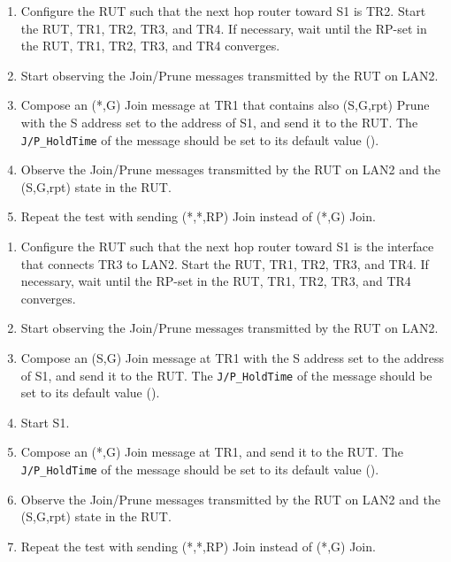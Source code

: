 \documentclass[11pt]{report}
\begin{document}
\begin{enumerate}

  \item Configure the RUT such that the next hop router toward S1 is
  TR2. Start the RUT, TR1, TR2, TR3, and TR4. If necessary, wait until the
  RP-set in the RUT, TR1, TR2, TR3, and TR4 converges.

  \item Start observing the Join/Prune messages transmitted by the RUT on
  LAN2.

  \item Compose an (*,G) Join message at TR1 that contains also (S,G,rpt)
  Prune with the S address set to the address of S1, and send it to the RUT.
  The \verb=J/P_HoldTime= of the message should be set to its default
  value ({\PimsmJPHoldTime}).

  \item Observe the Join/Prune messages transmitted by the RUT on LAN2 and the
  (S,G,rpt) state in the RUT.

  \item Repeat the test with sending (*,*,RP) Join instead of (*,G) Join.

\end{enumerate}


\begin{enumerate}

  \item Configure the RUT such that the next hop router toward S1 is
  the interface that connects TR3 to LAN2. Start the RUT, TR1, TR2, TR3, and
  TR4. If necessary, wait until the RP-set in the RUT, TR1, TR2, TR3, and TR4
  converges.

  \item Start observing the Join/Prune messages transmitted by the RUT on
  LAN2.

  \item Compose an (S,G) Join message at TR1 with the S address set to the
  address of S1, and send it to the RUT. 
  The \verb=J/P_HoldTime= of the message should be set to its default
  value ({\PimsmJPHoldTime}).

  \item Start S1.

  \item Compose an (*,G) Join message at TR1, and send it to the RUT. 
  The \verb=J/P_HoldTime= of the message should be set to its default
  value ({\PimsmJPHoldTime}).

  \item Observe the Join/Prune messages transmitted by the RUT on LAN2 and the
  (S,G,rpt) state in the RUT.

  \item Repeat the test with sending (*,*,RP) Join instead of (*,G) Join.

\end{enumerate}
\end{document}
